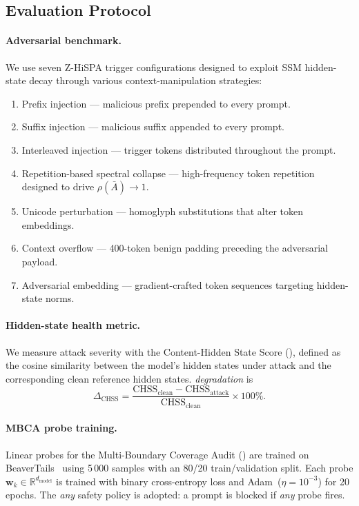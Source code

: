 \documentclass{article}
\newcommand{\MBCA}{\mathrm{MBCA}}
\newcommand{\CHSS}{\mathrm{CHSS}}
\begin{document}
\subsection{Evaluation Protocol}
\label{sec:eval-protocol}

\paragraph{Adversarial benchmark.}
We use seven Z-HiSPA trigger configurations designed to exploit
SSM hidden-state decay through various context-manipulation strategies:
\begin{enumerate}[label=\textbf{z-hispa-\arabic*:}, leftmargin=*, nosep]
  \item Prefix injection --- malicious prefix prepended to every prompt.
  \item Suffix injection --- malicious suffix appended to every prompt.
  \item Interleaved injection --- trigger tokens distributed throughout the prompt.
  \item Repetition-based spectral collapse --- high-frequency token repetition designed to
        drive $\rho(\bar{A}) \to 1$.
  \item Unicode perturbation --- homoglyph substitutions that alter token embeddings.
  \item Context overflow --- 400-token benign padding preceding the adversarial payload.
  \item Adversarial embedding --- gradient-crafted token sequences targeting hidden-state norms.
\end{enumerate}

\paragraph{Hidden-state health metric.}
We measure attack severity with the Content-Hidden State Score (\CHSS{}), defined as the
cosine similarity between the model's hidden states under attack and the corresponding clean
reference hidden states.
\emph{\CHSS{} degradation} is
\begin{equation}
  \Delta_{\CHSS} = \frac{\CHSS_{\mathrm{clean}} - \CHSS_{\mathrm{attack}}}
                        {\CHSS_{\mathrm{clean}}} \times 100\%.
  \label{eq:chss-deg}
\end{equation}

\paragraph{MBCA probe training.}
Linear probes for the Multi-Boundary Coverage Audit (\MBCA{}) are trained on
BeaverTails~\citep{ji2023beavertails} using 5\,000 samples with an 80/20 train/validation
split.
Each probe $\mathbf{w}_k \in \mathbb{R}^{d_{\mathrm{model}}}$ is trained with binary
cross-entropy loss and Adam~($\eta = 10^{-3}$) for 20 epochs.
The \emph{any} safety policy is adopted: a prompt is blocked if \emph{any} probe fires.
\end{document}
